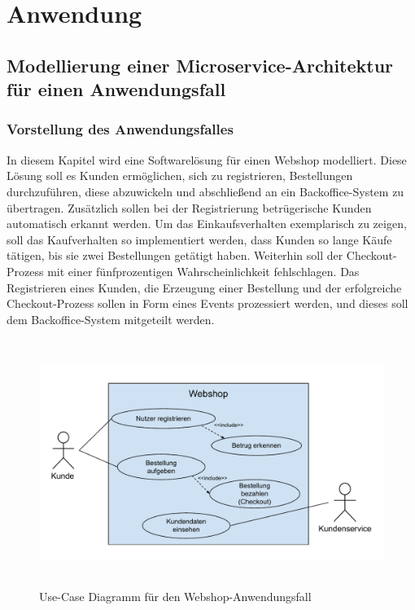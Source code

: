 \chapter{Anwendung}

\section{Modellierung einer Microservice-Architektur für einen Anwendungsfall}

\subsection{Vorstellung des Anwendungsfalles}

In diesem Kapitel wird eine Softwarelösung für einen Webshop modelliert. Diese Lösung soll es Kunden ermöglichen, sich zu registrieren, Bestellungen durchzuführen, diese abzuwickeln und abschließend an ein Backoffice-System zu übertragen. Zusätzlich sollen bei der Registrierung betrügerische Kunden automatisch erkannt werden. Um das Einkaufsverhalten exemplarisch zu zeigen, soll das Kaufverhalten so implementiert werden, dass Kunden so lange Käufe tätigen, bis sie zwei Bestellungen getätigt haben. Weiterhin soll der Checkout-Prozess mit einer fünfprozentigen Wahrscheinlichkeit fehlschlagen. Das Registrieren eines Kunden, die Erzeugung einer Bestellung und der erfolgreiche Checkout-Prozess sollen in Form eines Events prozessiert werden, und dieses soll dem Backoffice-System mitgeteilt werden.

\begin{figure}[ht]
\centering
\includegraphics[height=8cm]{bilder/k6/UseCase.pdf}
\caption{Use-Case Diagramm für den Webshop-Anwendungsfall}
\end{figure}

